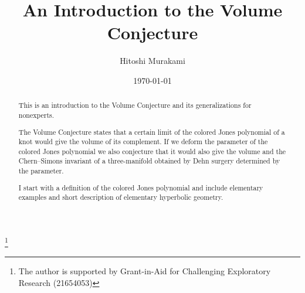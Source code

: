 \documentclass{amsart}
\theoremstyle{definition}
\theoremstyle{remark}
\numberwithin{equation}{section}
\begin{document}
\title{An Introduction to the Volume Conjecture}

\author{Hitoshi Murakami}
\address{Department of Mathematics,
Tokyo Institute of Technology,
Oh-okayama, Meguro, Tokyo 152-8551, Japan}

\date{\today}
\begin{abstract}
This is an introduction to the Volume Conjecture and its generalizations for nonexperts.
\par
The Volume Conjecture states that a certain limit of the colored Jones polynomial of a knot would give the volume of its complement.
If we deform the parameter of the colored Jones polynomial we also conjecture that it would also give the volume and the Chern--Simons invariant of a three-manifold obtained by Dehn surgery determined by the parameter.
\par
I start with a definition of the colored Jones polynomial and include elementary examples and short description of elementary hyperbolic geometry.
\end{abstract}
%

\thanks{The author is supported by Grant-in-Aid for Challenging Exploratory Research (21654053)}
\maketitle
\end{document}
